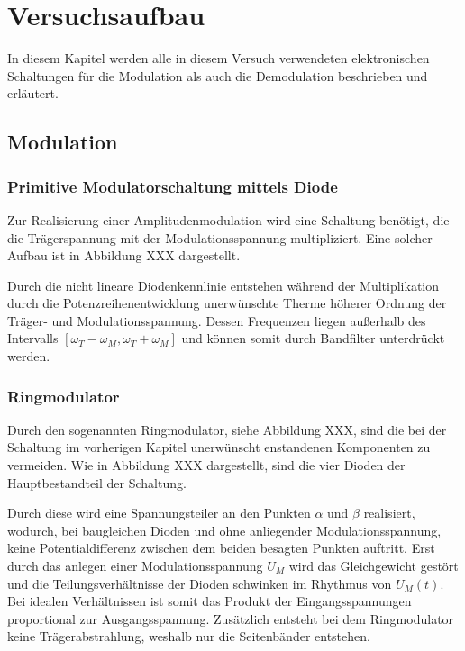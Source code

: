 \section{Versuchsaufbau}
\label{sec:Versuchaufbau}
In diesem Kapitel werden alle in diesem Versuch verwendeten elektronischen Schaltungen für die Modulation als auch die Demodulation beschrieben und erläutert.
\subsection{Modulation}
\subsubsection{Primitive Modulatorschaltung mittels Diode}
Zur Realisierung einer Amplitudenmodulation wird eine Schaltung benötigt, die die Trägerspannung mit der Modulationsspannung multipliziert. Eine solcher Aufbau ist in Abbildung XXX dargestellt.


Durch die nicht lineare Diodenkennlinie entstehen während der Multiplikation durch die Potenzreihenentwicklung unerwünschte Therme höherer Ordnung der Träger- und Modulationsspannung. Dessen Frequenzen liegen außerhalb des Intervalls $[\omega_T-\omega_M, \omega_T+\omega_M]$ und können somit durch Bandfilter unterdrückt werden.

\subsubsection{Ringmodulator}
Durch den sogenannten Ringmodulator, siehe Abbildung XXX, sind die bei der Schaltung im vorherigen Kapitel unerwünscht enstandenen Komponenten zu vermeiden. Wie in Abbildung XXX dargestellt, sind die vier Dioden der Hauptbestandteil der Schaltung. 


Durch diese wird eine Spannungsteiler an den Punkten $\alpha$ und $\beta$ realisiert, wodurch, bei baugleichen Dioden und ohne anliegender Modulationsspannung, keine Potentialdifferenz zwischen dem beiden besagten Punkten auftritt. Erst durch das anlegen einer Modulationsspannung $U_M$ wird das Gleichgewicht gestört und die Teilungsverhältnisse der Dioden schwinken im Rhythmus von $U_M(t)$. Bei idealen Verhältnissen ist somit das Produkt der Eingangsspannungen proportional zur Ausgangsspannung. Zusätzlich entsteht bei dem Ringmodulator keine Trägerabstrahlung, weshalb nur die Seitenbänder entstehen.

